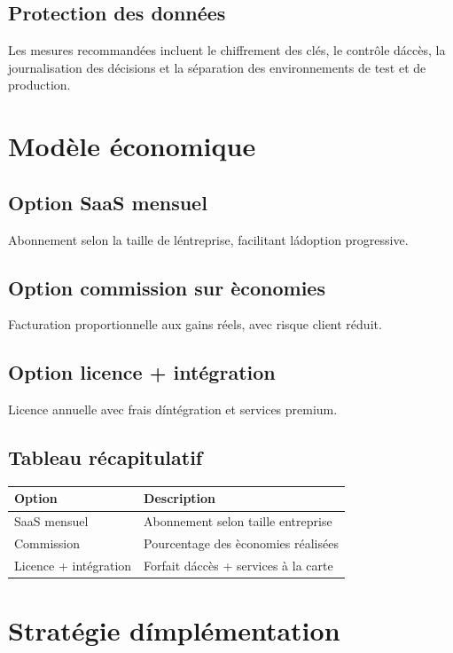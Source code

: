 \documentclass[12pt,a4paper]{report}
\begin{document}
\section{Protection des donn\'ees}
Les mesures recommand\'ees incluent le chiffrement des cl\'es, le contr\^ole d\'acc\`es, la journalisation des d\'ecisions et la s\'eparation des environnements de test et de production.

\cleardoublepage

\chapter{Mod\`ele \'economique}
\section{Option SaaS mensuel}
Abonnement selon la taille de l\'entreprise, facilitant l\'adoption progressive.

\section{Option commission sur \`economies}
Facturation proportionnelle aux gains r\'eels, avec risque client r\'eduit.

\section{Option licence + int\'egration}
Licence annuelle avec frais d\'int\'egration et services premium.

\section{Tableau r\'ecapitulatif}
\begin{longtable}{p{5cm} p{8cm}}
\toprule
Option & Description \\
\midrule
SaaS mensuel & Abonnement selon taille entreprise \\
Commission & Pourcentage des \`economies r\'ealis\'ees \\
Licence + int\'egration & Forfait d\'acc\`es + services \`a la carte \\
\bottomrule
\end{longtable}

\cleardoublepage

\chapter{Strat\'egie d\'impl\'ementation}
\end{document}
